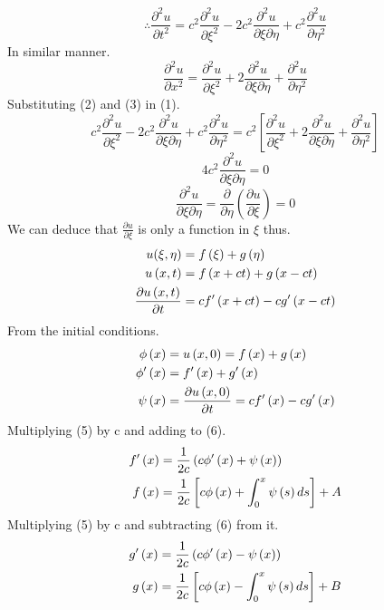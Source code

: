 \documentclass[]{article}
\begin{document}
\begin{equation}
\therefore \frac{\partial^2 u}{\partial t^2} = c^2\frac{\partial^2 u}{\partial\xi^2}-2c^2\frac{\partial^2 u}{\partial\xi\partial\eta}+c^2\frac{\partial^2 u}{\partial\eta^2}
\end{equation}
In similar manner.
\begin{equation}
\frac{\partial^2 u}{\partial x^2} = \frac{\partial^2 u}{\partial\xi^2}+2\frac{\partial^2 u}{\partial\xi\partial\eta}+\frac{\partial^2 u}{\partial\eta^2}
\end{equation}
Substituting (2) and (3) in (1).
\[
c^2\frac{\partial^2 u}{\partial\xi^2}-2c^2\frac{\partial^2 u}{\partial\xi\partial\eta}+c^2\frac{\partial^2 u}{\partial\eta^2} = c^2\left[\frac{\partial^2 u}{\partial\xi^2}+2\frac{\partial^2 u}{\partial\xi\partial\eta}+\frac{\partial^2 u}{\partial\eta^2}\right]    
\]
\[
    4c^2 \frac{\partial^2 u}{\partial\xi\partial\eta} =0    
\]
\[
    \frac{\partial^2 u}{\partial\xi\partial\eta} = \frac{\partial}{\partial\eta}\left(\frac{\partial u}{\partial\xi}\right)= 0    
\]
We can deduce that $\displaystyle \frac{\partial u}{\partial\xi}$ is only a function in $\xi$ thus.
\begin{align}
u(\xi , \eta) &= f\left(\xi\right)+g\left(\eta \right)\notag
\\
u\left(x,t\right)&=f\left(x+ct\right)+g\left(x-ct\right)
\\
\frac{\partial u\left(x,t\right)}{\partial t} &= cf'\left(x+ct\right)-cg'\left(x-ct\right)\notag
\end{align}
From the initial conditions.
\begin{align}
\phi\left(x\right) &= u\left(x,0\right)= f\left(x\right)+g\left(x\right)\notag
\\ 
\phi'\left(x\right) &= f'\left(x\right)+g'\left(x\right)
\\ 
\psi\left(x\right)&=\frac{\partial u\left(x,0\right)}{\partial t} = cf'\left(x\right)-cg'\left(x\right)
\end{align}
Multiplying (5) by c and adding to (6).
\begin{align}
f'\left(x\right) &= \frac{1}{2c}\left(c\phi'\left(x\right)+\psi\left(x\right)\right)\notag
\\ 
f\left(x\right) &= \frac{1}{2c}\left[c\phi\left(x\right)+\int_0^x \psi\left(s\right)ds\right]+A
\end{align}
Multiplying (5) by c and subtracting (6) from it.
\begin{align}
g'\left(x\right) &= \frac{1}{2c}\left(c\phi'\left(x\right)-\psi\left(x\right)\right)\notag
\\ 
g\left(x\right) &= \frac{1}{2c}\left[c\phi\left(x\right)-\int_0^x \psi\left(s\right)ds\right]+B
\end{align}
\end{document}
